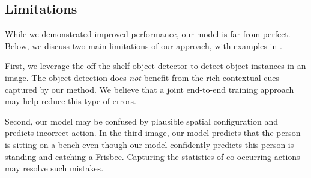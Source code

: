 \subsection{Limitations}
While we demonstrated improved performance, our model is far from perfect. 
Below, we discuss two main limitations of our approach, with examples in .


First, we leverage the off-the-shelf object detector to detect object instances in an image. 
The object detection does \emph{not} benefit from the rich contextual cues captured by our method.
We believe that a joint end-to-end training approach may help reduce this type of errors. 

Second, our model may be confused by plausible spatial configuration and predicts incorrect action. 
In the third image, our model predicts that the person is sitting on a bench even though our model confidently predicts this person is standing and catching a Frisbee.
Capturing the statistics of co-occurring actions may resolve such mistakes.









%
